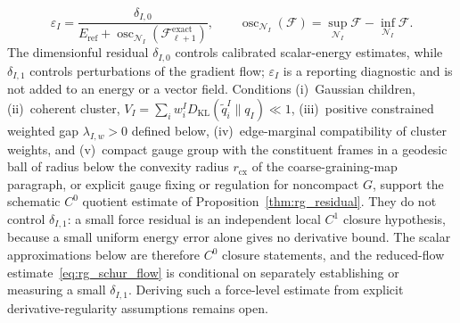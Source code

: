\begin{equation}
\varepsilon_I=\frac{\delta_{I,0}}{E_{\mathrm{ref}}+\operatorname{osc}_{\mathcal{N}_I}(\mathcal{F}^{\mathrm{exact}}_{\ell+1})}, \qquad
\operatorname{osc}_{\mathcal{N}_I}(\mathcal{F})=\sup_{\mathcal{N}_I}\mathcal{F}-\inf_{\mathcal{N}_I}\mathcal{F}.
\label{eq:rg_closure_dimensionless}
\end{equation}
The dimensionful residual $\delta_{I,0}$ controls calibrated scalar-energy estimates, while $\delta_{I,1}$ controls perturbations of the gradient flow; $\varepsilon_I$ is a reporting diagnostic and is not added to an energy or a vector field. Conditions (i)~Gaussian children, (ii)~coherent cluster, $V_I = \sum_i w_i^I D_{\mathrm{KL}}(\widetilde{q}_i^I \| q_I) \ll 1$, (iii)~positive constrained weighted gap $\lambda_{I,w} > 0$ defined below, (iv)~edge-marginal compatibility of cluster weights, and (v)~compact gauge group with the constituent frames in a geodesic ball of radius below the convexity radius $r_{\mathrm{cx}}$ of the coarse-graining-map paragraph, or explicit gauge fixing or regulation for noncompact $G$, support the schematic $C^0$ quotient estimate of Proposition~\ref{thm:rg_residual}. They do not control $\delta_{I,1}$: a small force residual is an independent local $C^1$ closure hypothesis, because a small uniform energy error alone gives no derivative bound. The scalar approximations below are therefore $C^0$ closure statements, and the reduced-flow estimate~\eqref{eq:rg_schur_flow} is conditional on separately establishing or measuring a small $\delta_{I,1}$. Deriving such a force-level estimate from explicit derivative-regularity assumptions remains open.

